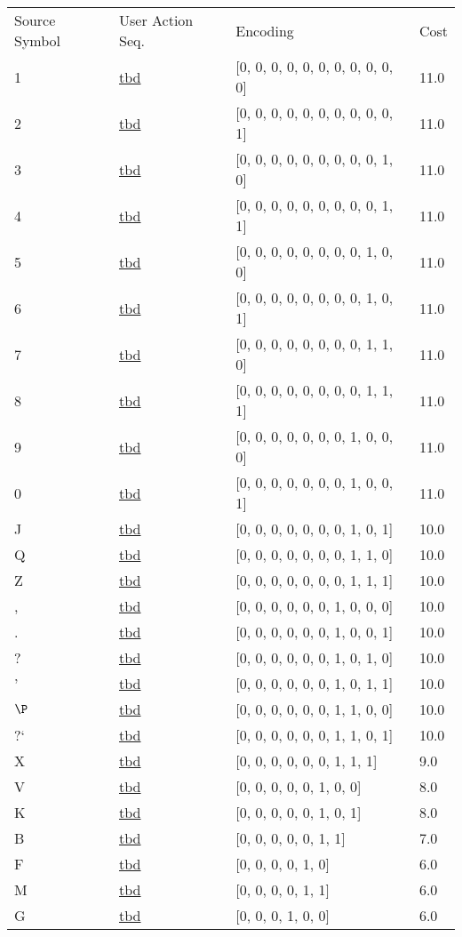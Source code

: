 \documentclass[12pt]{article}
\begin{document}
\begin{tabular}{l l l l}
Source Symbol	&	User Action Seq.	&	Encoding	&	Cost\\
1	&	\url{tbd}	&	[0, 0, 0, 0, 0, 0, 0, 0, 0, 0, 0]	&	11.0\\
2	&	\url{tbd}	&	[0, 0, 0, 0, 0, 0, 0, 0, 0, 0, 1]	&	11.0\\
3	&	\url{tbd}	&	[0, 0, 0, 0, 0, 0, 0, 0, 0, 1, 0]	&	11.0\\
4	&	\url{tbd}	&	[0, 0, 0, 0, 0, 0, 0, 0, 0, 1, 1]	&	11.0\\
5	&	\url{tbd}	&	[0, 0, 0, 0, 0, 0, 0, 0, 1, 0, 0]	&	11.0\\
6	&	\url{tbd}	&	[0, 0, 0, 0, 0, 0, 0, 0, 1, 0, 1]	&	11.0\\
7	&	\url{tbd}	&	[0, 0, 0, 0, 0, 0, 0, 0, 1, 1, 0]	&	11.0\\
8	&	\url{tbd}	&	[0, 0, 0, 0, 0, 0, 0, 0, 1, 1, 1]	&	11.0\\
9	&	\url{tbd}	&	[0, 0, 0, 0, 0, 0, 0, 1, 0, 0, 0]	&	11.0\\
0	&	\url{tbd}	&	[0, 0, 0, 0, 0, 0, 0, 1, 0, 0, 1]	&	11.0\\
J	&	\url{tbd}	&	[0, 0, 0, 0, 0, 0, 0, 1, 0, 1]	&	10.0\\
Q	&	\url{tbd}	&	[0, 0, 0, 0, 0, 0, 0, 1, 1, 0]	&	10.0\\
Z	&	\url{tbd}	&	[0, 0, 0, 0, 0, 0, 0, 1, 1, 1]	&	10.0\\
,	&	\url{tbd}	&	[0, 0, 0, 0, 0, 0, 1, 0, 0, 0]	&	10.0\\
.	&	\url{tbd}	&	[0, 0, 0, 0, 0, 0, 1, 0, 0, 1]	&	10.0\\
?	&	\url{tbd}	&	[0, 0, 0, 0, 0, 0, 1, 0, 1, 0]	&	10.0\\
'	&	\url{tbd}	&	[0, 0, 0, 0, 0, 0, 1, 0, 1, 1]	&	10.0\\
$\P$	&	\url{tbd}	&	[0, 0, 0, 0, 0, 0, 1, 1, 0, 0]	&	10.0\\
?`	&	\url{tbd}	&	[0, 0, 0, 0, 0, 0, 1, 1, 0, 1]	&	10.0\\
X	&	\url{tbd}	&	[0, 0, 0, 0, 0, 0, 1, 1, 1]	&	9.0\\
V	&	\url{tbd}	&	[0, 0, 0, 0, 0, 1, 0, 0]	&	8.0\\
K	&	\url{tbd}	&	[0, 0, 0, 0, 0, 1, 0, 1]	&	8.0\\
B	&	\url{tbd}	&	[0, 0, 0, 0, 0, 1, 1]	&	7.0\\
F	&	\url{tbd}	&	[0, 0, 0, 0, 1, 0]	&	6.0\\
M	&	\url{tbd}	&	[0, 0, 0, 0, 1, 1]	&	6.0\\
G	&	\url{tbd}	&	[0, 0, 0, 1, 0, 0]	&	6.0\\

\end{tabular}
\end{document}
